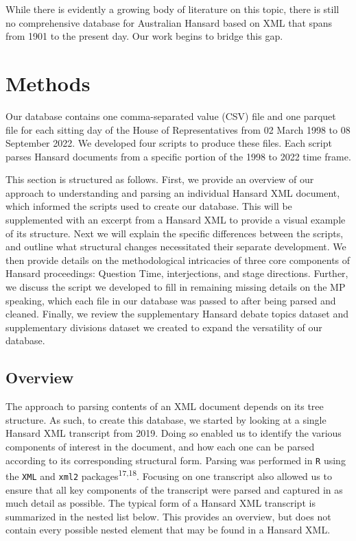 \documentclass[
  letterpaper,
  DIV=11,
  numbers=noendperiod]{scrartcl}
\begin{document}
While there is evidently a growing body of literature on this topic,
there is still no comprehensive database for Australian Hansard based on
XML that spans from 1901 to the present day. Our work begins to bridge
this gap.

\hypertarget{methods}{%
\section{Methods}\label{methods}}

Our database contains one comma-separated value (CSV) file and one
parquet file for each sitting day of the House of Representatives from
02 March 1998 to 08 September 2022. We developed four scripts to produce
these files. Each script parses Hansard documents from a specific
portion of the 1998 to 2022 time frame.

This section is structured as follows. First, we provide an overview of
our approach to understanding and parsing an individual Hansard XML
document, which informed the scripts used to create our database. This
will be supplemented with an excerpt from a Hansard XML to provide a
visual example of its structure. Next we will explain the specific
differences between the scripts, and outline what structural changes
necessitated their separate development. We then provide details on the
methodological intricacies of three core components of Hansard
proceedings: Question Time, interjections, and stage directions.
Further, we discuss the script we developed to fill in remaining missing
details on the MP speaking, which each file in our database was passed
to after being parsed and cleaned. Finally, we review the supplementary
Hansard debate topics dataset and supplementary divisions dataset we
created to expand the versatility of our database.

\hypertarget{sec-overview}{%
\subsection{Overview}\label{sec-overview}}

The approach to parsing contents of an XML document depends on its tree
structure. As such, to create this database, we started by looking at a
single Hansard XML transcript from 2019. Doing so enabled us to identify
the various components of interest in the document, and how each one can
be parsed according to its corresponding structural form. Parsing was
performed in \texttt{R} using the \texttt{XML} and \texttt{xml2}
packages\textsuperscript{17,18}. Focusing on one transcript also allowed
us to ensure that all key components of the transcript were parsed and
captured in as much detail as possible. The typical form of a Hansard
XML transcript is summarized in the nested list below. This provides an
overview, but does not contain every possible nested element that may be
found in a Hansard XML.
\end{document}
